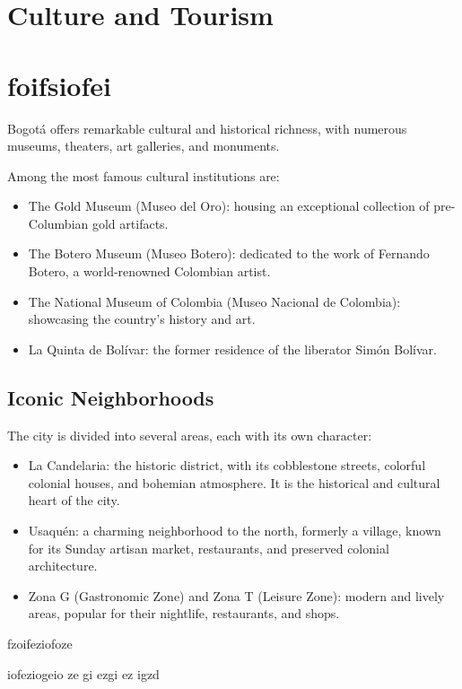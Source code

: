 \documentclass{article}
\begin{document}
\section{Culture and Tourism}

\section{foifsiofei}

Bogotá offers remarkable cultural and historical richness, with numerous museums, theaters, art galleries, and monuments.

Among the most famous cultural institutions are:
\begin{itemize}
    \item The Gold Museum (Museo del Oro): housing an exceptional collection of pre-Columbian gold artifacts.
    \item The Botero Museum (Museo Botero): dedicated to the work of Fernando Botero, a world-renowned Colombian artist.
    \item The National Museum of Colombia (Museo Nacional de Colombia): showcasing the country's history and art.
    \item La Quinta de Bolívar: the former residence of the liberator Simón Bolívar.
\end{itemize}

\subsection{Iconic Neighborhoods}
The city is divided into several areas, each with its own character:
\begin{itemize}
    \item La Candelaria: the historic district, with its cobblestone streets, colorful colonial houses, and bohemian atmosphere. It is the historical and cultural heart of the city.    
    \item Usaquén: a charming neighborhood to the north, formerly a village, known for its Sunday artisan market, restaurants, and preserved colonial architecture.
    \item Zona G (Gastronomic Zone) and Zona T (Leisure Zone): modern and lively areas, popular for their nightlife, restaurants, and shops.
\end{itemize}
fzoifeziofoze

iofeziogeio
ze gi
ezgi
ez
igzd
\end{document}

